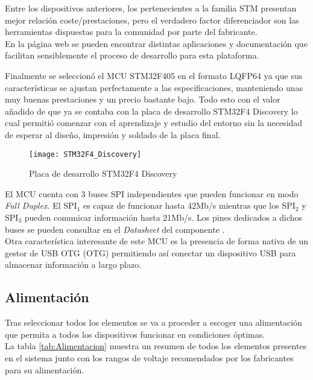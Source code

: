 Entre los dispositivos anteriores, los pertenecientes a la familia STM presentan mejor relación coste/prestaciones, pero el verdadero factor diferenciador son las herramientas dispuestas para la comunidad por parte del fabricante.
\\En la página web se pueden encontrar distintas aplicaciones y documentación que facilitan sensiblemente el proceso de desarrollo para esta plataforma. 

Finalmente se seleccionó el \acrshort{MCU} STM32F405 en el formato \acrshort{LQFP64} ya que sus características se ajustan perfectamente a las especificaciones, manteniendo unas muy buenas prestaciones y un precio bastante bajo. Todo esto con el valor añadido de que ya se contaba con la placa de desarrollo STM32F4 Discovery lo cual permitió comenzar con el aprendizaje y estudio del entorno sin la necesidad de esperar al diseño, impresión y soldado de la placa final.

\begin{figure} [h]
    \centering
    \texttt{[image: STM32F4\_Discovery]}
    \caption{Placa de desarrollo STM32F4 Discovery}
    \label{fig:STM32F4_Discovery}
\end{figure}

El \acrshort{MCU} cuenta con 3 buses SPI independientes que pueden funcionar en modo \textit{\gls{Full Duplex}}. El SPI$_1$  es capaz de funcionar hasta 42Mb/s mientras que los SPI$_2$ y SPI$_3$ pueden comunicar información hasta 21Mb/s. Los pines dedicados a dichos buses se pueden consultar en el \textit{Datasheet} del componente \cite{Datasheet_STM}.
\\Otra característica interesante de este \acrshort{MCU} es la presencia de forma nativa de un gestor de \acrshort{USB} \acrlong{OTG} (\acrshort{OTG}) permitiendo así conectar un dispositivo \acrshort{USB} para almacenar información a largo plazo.

\clearpage

\subsection{Alimentación\label{sec:Alimentación}}

Tras seleccionar todos los elementos se va a proceder a escoger una alimentación que permita a todos los dispositivos funcionar en condiciones óptimas.
\\La tabla \ref{tab:Alimentacion} muestra un resumen de todos los elementos presentes en el sistema junto con los rangos de voltaje recomendados por los fabricantes para su alimentación.

